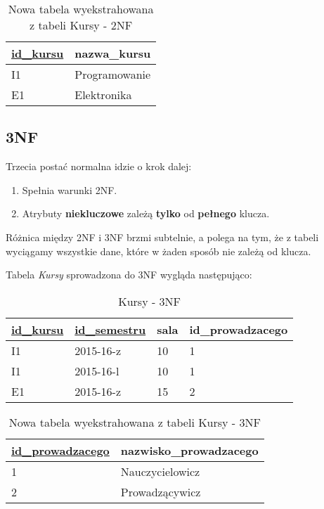 \begin{table}[H]
	\centering
	\caption{Nowa tabela wyekstrahowana z tabeli Kursy - 2NF}
	\label{my-label}
	\begin{tabular}{|l|l|}
		\hline
		\underline{id\_kursu} & nazwa\_kursu  \\ \hline
		I1              & Programowanie \\ \hline
		E1              & Elektronika   \\ \hline
	\end{tabular}
\end{table}

\subsection*{3NF}
Trzecia postać normalna idzie o krok dalej:
\begin{enumerate}
	\item{Spełnia warunki 2NF.}
	\item{Atrybuty \textbf{niekluczowe} zależą \textbf{tylko} od \textbf{pełnego} klucza.}
\end{enumerate}

Różnica między 2NF i 3NF brzmi subtelnie, a polega na tym, że z tabeli wyciągamy wszystkie dane, które w żaden sposób nie zależą od klucza.

Tabela \textit{Kursy} sprowadzona do 3NF wygląda następująco:

\begin{table}[H]
	\centering
	\caption{Kursy - 3NF}
	\label{my-label}
	\begin{tabular}{|l|l|l|l|}
		\hline
		\underline{id\_kursu} & \underline{id\_semestru} & sala  & id\_prowadzacego \\ \hline
		I1        & 2015-16-z    & 10   & 1                \\ \hline
		I1        & 2015-16-l    & 10   & 1                \\ \hline
		E1        & 2015-16-z    & 15   & 2                \\ \hline
	\end{tabular}
\end{table}

\begin{table}[H]
	\centering
	\caption{Nowa tabela wyekstrahowana z tabeli Kursy - 3NF}
	\label{my-label}
	\begin{tabular}{|l|l|}
		\hline
		\underline{id\_prowadzacego} & nazwisko\_prowadzacego  \\ \hline
		1              & Nauczycielowicz \\ \hline
		2              & Prowadzącywicz   \\ \hline
	\end{tabular}
\end{table}